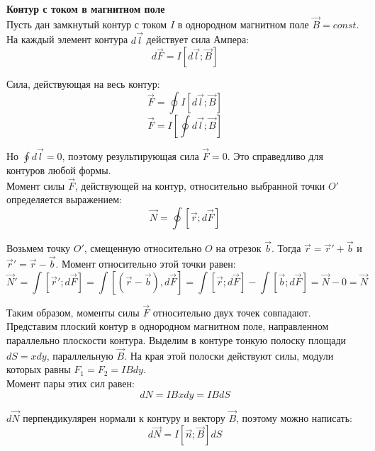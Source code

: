 \documentclass{article}
\begin{document}
	
	\textbf{Контур с током в магнитном поле}\\

	Пусть дан замкнутый контур с током $I$ в однородном магнитном поле $\vec B = const$.\\

	На каждый элемент контура $d\vec l$ действует сила Ампера:
	\begin{equation}
		d\vec F = I[d\vec l;\vec B]
	\end{equation}

	Сила, действующая на весь контур:
	\begin{equation}
		\vec F = \oint I[d\vec l;\vec B]
	\end{equation}
	\begin{equation}
		\vec F = I[\oint d\vec l;\vec B]
	\end{equation}

	Но $\oint d\vec l = 0$, поэтому результирующая сила $\vec F=0$. Это справедливо для контуров любой формы.\\

	Момент силы $\vec F$, действующей на контур, относительно выбранной точки $O'$ определяется выражением:
	\begin{equation}
		\vec N = \oint[\vec r;d\vec F]
	\end{equation}

	Возьмем точку $O'$, смещенную относительно $O$ на отрезок $\vec b$. Тогда $\vec r = \vec r' + \vec b$ и $\vec r' = \vec r - \vec b$. Момент относительно этой точки равен:
	\begin{equation}
		\vec N' = \int[\vec r';d\vec F] = \int[(\vec r - \vec b),d\vec F] = \int [\vec r;d\vec F] - \int [\vec b; d\vec F] = \vec N - 0 = \vec N
	\end{equation}

	Таким образом, моменты силы $\vec F$ относительно двух точек совпадают. \\

	Представим плоский контур в однородном магнитном поле, направленном параллельно плоскости контура. Выделим в контуре тонкую полоску площади $dS = xdy$, параллельную $\vec B$. На края этой полоски действуют силы, модули которых равны $F_1=F_2=IBdy$.\\

	Момент пары этих сил равен:
	\begin{equation}
		dN = IBxdy = IBdS
	\end{equation}

	$d\vec N$ перпендикулярен нормали к контуру и вектору $\vec B$, поэтому можно написать:
	\begin{equation}
		d\vec N = I[\vec n;\vec B]dS
	\end{equation}
\end{document}
